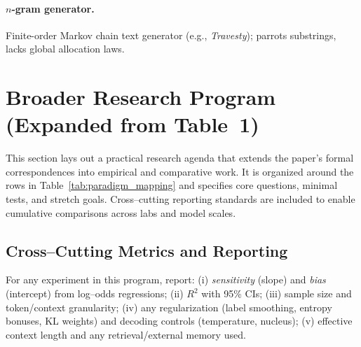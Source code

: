 \documentclass[11pt]{article}
\begin{document}
\paragraph{$n$-gram generator.}
Finite-order Markov chain text generator (e.g., \emph{Travesty}); parrots substrings, lacks global allocation laws.

\section{Broader Research Program (Expanded from Table~1)}
\label{sec:program}

This section lays out a practical research agenda that extends the paper’s formal correspondences into empirical and comparative work. It is organized around the rows in Table~\ref{tab:paradigm_mapping} and specifies core questions, minimal tests, and stretch goals. Cross–cutting reporting standards are included to enable cumulative comparisons across labs and model scales.

\subsection*{Cross–Cutting Metrics and Reporting}
For any experiment in this program, report: (i) \emph{sensitivity} (slope) and \emph{bias} (intercept) from log–odds regressions; (ii) $R^2$ with 95\% CIs; (iii) sample size and token/context granularity; (iv) any regularization (label smoothing, entropy bonuses, KL weights) and decoding controls (temperature, nucleus); (v) effective context length and any retrieval/external memory used.
\end{document}
